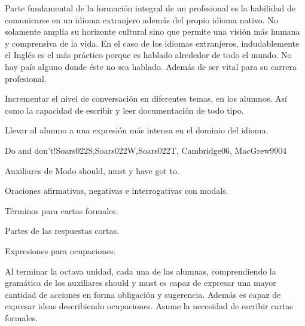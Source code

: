 \begin{syllabus}


\begin{justification}
Parte fundamental de la formación integral de un profesional es la habilidad 
de comunicarse en un idioma extranjero además del propio idioma nativo. 
No solamente amplía su horizonte cultural sino que permite una visión 
más humana y comprensiva de la vida. En el caso de los idiomas extranjeros, 
indudablemente el Inglés es el más práctico porque es hablado alrededor de 
todo el mundo. No hay país alguno donde éste no sea hablado. Además de ser 
vital para su carrera profesional.
\end{justification}

\begin{goals}
\item Incrementar el nivel de conversación en diferentes temas, en los alumnos. Así como la capacidad de escribir y leer documentación de todo tipo.
\item Llevar al alumno a una expresión más intensa en el dominio del idioma.
\end{goals}

\begin{outcomes}
\end{outcomes}

\begin{unit}{Do and don't!}{Soars022S,Soars022W,Soars022T, Cambridge06, MacGrew99}{0}{4}
   \begin{topics}
      \item Auxiliares de Modo should, must y have got to.
      \item Oraciones afirmativas, negativas e interrogativas con modals.
      \item Términos para cartas formales.
      \item Partes de las respuestas cortas.
      \item Expresiones para ocupaciones.
   \end{topics}

   \begin{learningoutcomes}
      \item Al terminar la octava unidad, cada una de las alumnas, comprendiendo la gramática de los auxiliares should y must  es capaz de expresar una mayor cantidad de acciones en forma obligación y sugerencia.  Además es capaz de expresar ideas describiendo ocupaciones.  Asume la necesidad de escribir cartas formales. 
   \end{learningoutcomes}
\end{unit}


\end{syllabus}
